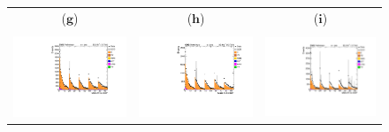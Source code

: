 \begin{figure}[htp]
\begin{tabular}{ccc}
   ($\mathbf{g}$)\qquad\qquad&($\mathbf{h}$)\qquad\qquad\qquad&($\mathbf{i}$)\qquad\qquad\qquad\\ \\
\hspace{-0.5cm}
\includegraphics[scale=0.3]{fig/chapt7/qcd/qcd_e_ch/massH_cos_theta1.pdf}
& \hspace{-1.2cm} \includegraphics[scale=0.3]{fig/chapt7/qcd/qcd_e_ch/massH_cos_theta2.pdf}
& \hspace{-1.2cm} \includegraphics[scale=0.3]{fig/chapt7/qcd/qcd_e_ch/massH_cos_theta3.pdf}\\

\end{tabular}
\end{figure}
